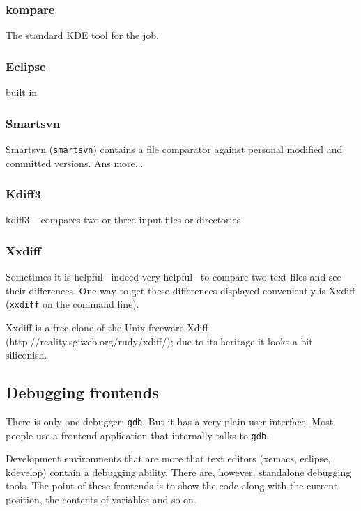 \subsubsection{kompare}

The standard KDE tool for the job.

\subsubsection{Eclipse}

built in

\subsubsection{Smartsvn}

Smartsvn (\texttt{smartsvn}) contains a file comparator against personal
modified and committed versions. Ans more...

\subsubsection{Kdiff3}

kdiff3 -- compares two or three input files or directories

\subsubsection{Xxdiff}

Sometimes it is helpful --indeed very helpful-- to compare two text
files and see their differences. One way to get these differences
displayed conveniently is Xxdiff (\texttt{xxdiff} on the command line).

Xxdiff is a free clone of the Unix freeware Xdiff (http://reality.sgiweb.org/rudy/xdiff/);
due to its heritage it looks a bit siliconish.






\subsection{Debugging frontends}

There is only one debugger: \texttt{gdb}. But it has a very plain
user interface. Most people use a frontend application that internally
talks to \texttt{gdb}.

Development environments that are more that text editors (xemacs,
eclipse, kdevelop) contain a debugging ability. There are, however,
standalone debugging tools. The point of these frontends is to show
the code along with the current position, the contents of variables
and so on.


